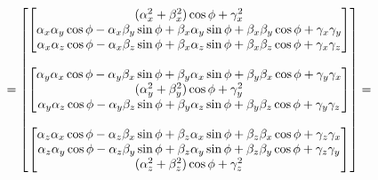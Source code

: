 \[
    =
    \begin{bmatrix}
        \begin{bmatrix}
            (\alpha_x^2 + \beta_x^2) \cos \phi + \gamma_x^2 \\
            \alpha_x \alpha_y \cos \phi - \alpha_x \beta_y \sin \phi + \beta_x \alpha_y \sin \phi + \beta_x \beta_y \cos \phi + \gamma_x \gamma_y \\
            \alpha_x \alpha_z \cos \phi - \alpha_x \beta_z \sin \phi + \beta_x \alpha_z \sin \phi + \beta_x \beta_z \cos \phi + \gamma_x \gamma_z \\
        \end{bmatrix} \\ \\
        \begin{bmatrix}
            \alpha_y \alpha_x \cos \phi - \alpha_y \beta_x \sin \phi + \beta_y \alpha_x \sin \phi + \beta_y \beta_x \cos \phi + \gamma_y \gamma_x \\
            (\alpha_y^2 + \beta_y^2) \cos \phi + \gamma_y^2 \\
            \alpha_y \alpha_z \cos \phi - \alpha_y \beta_z \sin \phi + \beta_y \alpha_z \sin \phi + \beta_y \beta_z \cos \phi + \gamma_y \gamma_z \\
        \end{bmatrix} \\ \\
        \begin{bmatrix}
            \alpha_z \alpha_x \cos \phi - \alpha_z \beta_x \sin \phi + \beta_z \alpha_x \sin \phi + \beta_z \beta_x \cos \phi + \gamma_z \gamma_x \\
            \alpha_z \alpha_y \cos \phi - \alpha_z \beta_y \sin \phi + \beta_z \alpha_y \sin \phi + \beta_z \beta_y \cos \phi + \gamma_z \gamma_y \\
            (\alpha_z^2 + \beta_z^2) \cos \phi + \gamma_z^2 \\
        \end{bmatrix} \\
    \end{bmatrix} =
\]
